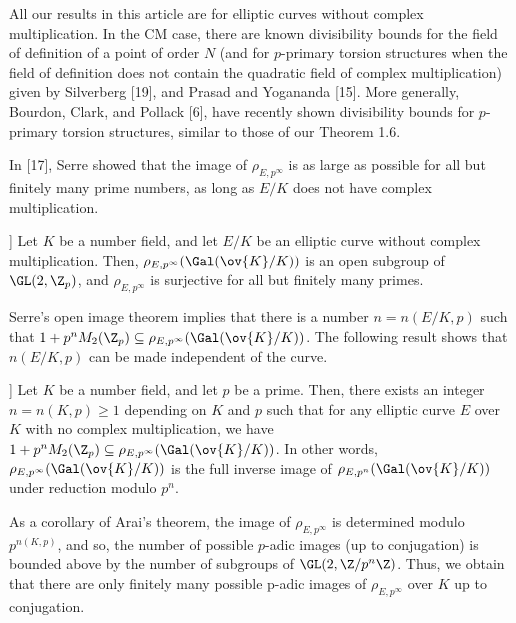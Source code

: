 \begin{rem} %
All our results in this article are for elliptic curves without complex multiplication.
In the CM case, there are known divisibility bounds for the field of definition of a point of order $N$ (and for $p$-primary torsion structures when the field of definition does not contain the quadratic field of complex multiplication) given by Silverberg [19], and Prasad and Yogananda [15]. More generally, Bourdon, Clark, and Pollack [6], have recently shown divisibility bounds for $p$-primary torsion structures, similar to those of our Theorem 1.6.
\end{rem}





In [17], Serre showed that the image of $\rho_{E,p^\infty}$ is as large as possible for all but finitely many prime numbers, as long as $E/K$ does not have complex multiplication.


\begin{thm}[Serre [17]]
Let $K$ be a number field, and let $E/K$ be an elliptic curve without complex multiplication. Then, $\rho_{E,p^\infty}(\Gal(\ov{K}/K))$ is an open subgroup of $\GL(2,\Z_p)$, and $\rho_{E,p^\infty}$ is surjective for all but finitely many primes. 
\end{thm}


Serre's open image theorem implies that there is a number $n= n(E/K,p)$ such that $1 + p^n M_2(\Z_p) \subseteq \rho_{E,p^\infty}(\Gal(\ov{K}/K))$. The following result shows that $n(E/K,p)$ can be made independent of the curve.


\begin{thm}[Arai [1]] %
Let $K$ be a number field, and let $p$ be a prime. Then, there exists an integer
$n= n(K, p) \geq 1$ depending on $K$ and $p$ such that for any elliptic curve $E$ over $K$ with no complex multiplication, we have $1 + p^n M_2(\Z_p) \subseteq \rho_{E,p^\infty}(\Gal(\ov{K}/K))$. In other words, $\rho_{E,p^\infty}(\Gal(\ov{K}/K))$ is the full inverse image of $\rho_{E,p^n}(\Gal(\ov{K}/K))$ under reduction modulo $p^n$. 
\end{thm}


As a corollary of Arai's theorem, the image of $\rho_{E,p^\infty}$ is determined modulo $p^{n(K,p)}$, and so, the number of possible $p$-adic images (up to conjugation) is bounded above by the number of subgroups of $\GL(2, \Z/p^n\Z)$. Thus, we obtain that there are only finitely many possible p-adic images of $\rho_{E,p^\infty}$ over $K$ up to conjugation.


